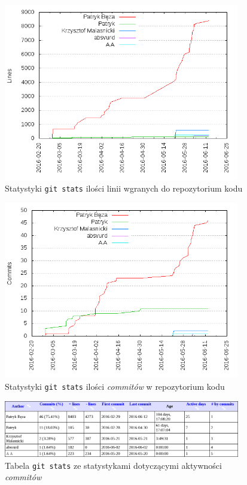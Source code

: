 \documentclass[a4paper,titlepage]{article}
\theoremstyle{break}
\numberwithin{equation}{subsection}
\begin{document}
\begin{figure}[H]
\center
\includegraphics[width=0.92\textwidth]{img/git_stats-lines_of_code_by_author}
\caption{Statystyki \texttt{git~stats} ilości linii wgranych do repozytorium kodu}
\label{fig:git-stats}
\end{figure}

\begin{figure}[H]
\center
\includegraphics[width=0.92\textwidth]{img/git_stats-commits_by_author}
\caption{Statystyki \texttt{git~stats} ilości \emph{commitów} w repozytorium kodu}
\label{fig:git-stats}
\end{figure}

\begin{figure}[H]
\center
\includegraphics[width=0.92\textwidth]{img/git_stats-commits}
\caption{Tabela \texttt{git stats} ze statystykami dotyczącymi aktywności \emph{commitów}}
\label{fig:git-stats}
\end{figure}


\clearpage
\printbibliography[title=Bibliografia]
\end{document}
